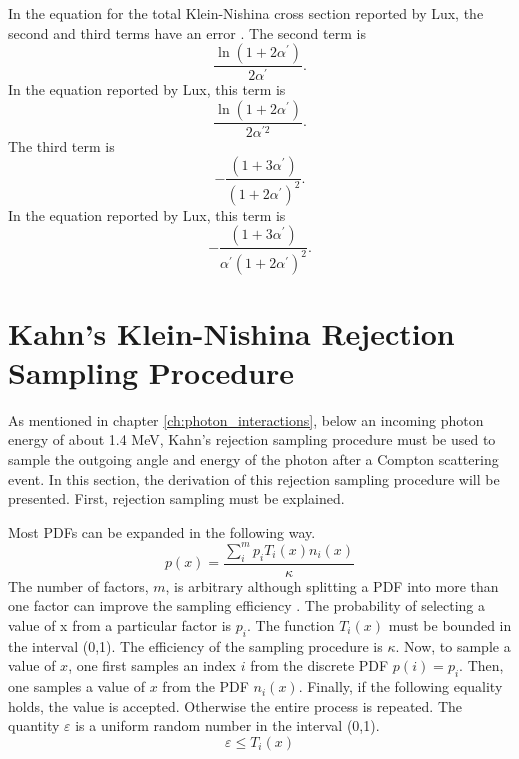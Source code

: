 In the equation for the total Klein-Nishina cross section reported by Lux, the
second and third terms have an error \citep{lux_monte_1991}. The second term is
\begin{equation*}
  \frac{\ln{(1 + 2\alpha^{'})}}{2\alpha^{'}}.
\end{equation*}
In the equation reported by Lux, this term is
\begin{equation*}
  \frac{\ln{(1 + 2\alpha^{'})}}{2\alpha^{'2}}.
\end{equation*}
The third term is 
\begin{equation*}
  -\frac{(1+3\alpha^{'})}{(1+2\alpha^{'})^2}.
\end{equation*}
In the equation reported by Lux, this term is
\begin{equation*}
  -\frac{(1+3\alpha^{'})}{\alpha^{'}(1+2\alpha^{'})^2}.
\end{equation*}

\section{Kahn's Klein-Nishina Rejection Sampling Procedure}
\label{sec:Kahn_rejection_procedure_der}
As mentioned in chapter \ref{ch:photon_interactions}, below an incoming photon
energy of about 1.4 MeV, Kahn's rejection sampling procedure must be used to
sample the outgoing angle and energy of the photon after a Compton scattering
event. In this section, the derivation of this rejection sampling procedure will
be presented. First, rejection sampling must be explained. 

Most PDFs can be expanded in the following way.
\begin{equation}
  p(x) = \frac{\sum_i^m p_i T_i(x)n_i(x)}{\kappa}
  \label{eq:general_pdf_expansion}
\end{equation}
The number of factors, $m$, is arbitrary although splitting a PDF into more than
one factor can improve the sampling efficiency \citep{kahn_applications_1956}.
The probability of selecting a value of x from a particular factor is $p_i$.
The function $T_i(x)$ must be bounded in the interval (0,1). The efficiency
of the sampling procedure is $\kappa$. Now, to sample a value of $x$, one 
first samples an index $i$ from the discrete PDF $p(i) = p_i$. Then, one 
samples a value of $x$ from the PDF $n_i(x)$. Finally, if the following 
equality holds, the value is accepted. Otherwise the entire process is repeated.
The quantity $\varepsilon$ is a uniform random number in the interval (0,1).
\begin{equation*}
  \varepsilon \leq T_i(x)
\end{equation*}

